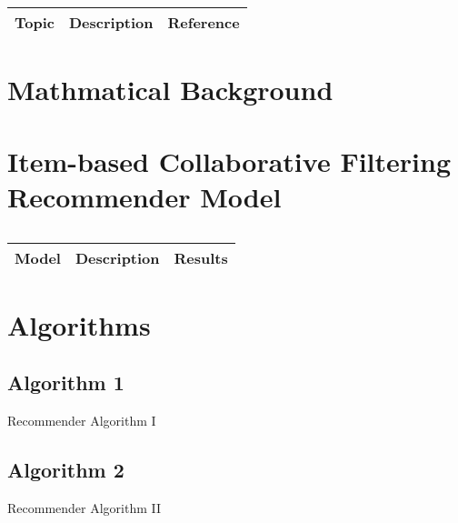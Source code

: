 \centering	
\begin{table}[H]\tiny
	\caption{}	
	\begin{tabular}{r|p{4cm}|l}
		\hline	
		Topic & Description & Reference \\
		\hline 
		\hline 
	\end{tabular}
\end{table}

\section{Mathmatical Background}

\section{Item-based Collaborative Filtering Recommender Model}

\centering	
\begin{table}[H]\tiny
	\caption{}	
	\begin{tabular}{r|p{4cm}|l}
		\hline	
		Model & Description & Results \\
		\hline 
		\hline 
	\end{tabular}
\end{table}

\section{Algorithms}

\subsection{Algorithm 1}

\begin{algorithm}[H]
\begin{algorithmic}[1]

\end{algorithmic}
	\caption{Recommender Algorithm I}
	\label{Recommender_1}
\end{algorithm}

\subsection{Algorithm 2}

\begin{algorithm}[H]
\begin{algorithmic}[1]

\end{algorithmic}
\caption{Recommender Algorithm II}
\label{Recommender_1}
\end{algorithm}

